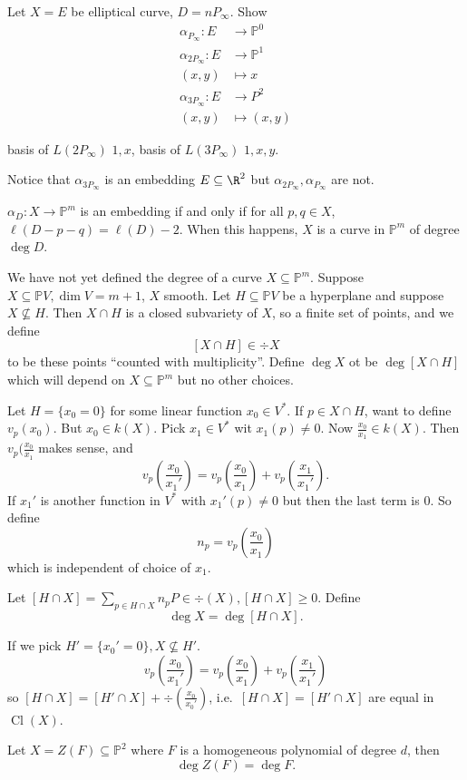 \documentclass[a4paper]{article}
\DeclareMathOperator{\Cl}{Cl}
\renewcommand*{\P}{\mathbb{P}}
\begin{document}
\begin{ex}
  Let \(X = E\) be elliptical curve, \(D = nP_\infty\). Show
  \begin{align*}
    \alpha_{P_\infty}: E &\to \P^0 \\
    \alpha_{2P_\infty}: E &\to \P^1 \\
    (x, y) &\mapsto x \\
    \alpha_{3P_\infty}: E &\to P^2 \\
    (x, y) &\mapsto (x, y)
  \end{align*}

  basis of \(L(2P_\infty)\) \(1, x\), basis of \(L(3P_\infty)\) \(1, x, y\).
  
  Notice that \(\alpha_{3P_\infty}\)  is an embedding \(E \subseteq \R^2\) but \(\alpha_{2P_\infty}, \alpha_{P_\infty}\) are not.
\end{ex}

\begin{theorem}
  \(\alpha_D: X \to \P^m\) is an embedding if and only if for all \(p, q \in X\), \(\ell(D - p - q) = \ell(D) - 2\). When this happens, \(X\) is a curve in \(\P^m\) of degree \(\deg D\).
\end{theorem}

We have not yet defined the degree of a curve \(X \subseteq \P^m\). Suppose \(X \subseteq \P V, \dim V = m + 1\), \(X\) smooth. Let \(H \subseteq \P V\) be a hyperplane and suppose \(X \nsubseteq H\). Then \(X \cap H\) is a closed subvariety of \(X\), so a finite set of points, and we define
\[
  [X \cap H] \in \div X
\]
to be these points ``counted with multiplicity''. Define \(\deg X\) ot be \(\deg [X \cap H]\) which will depend on \(X \subseteq \P^m\) but no other choices.

\begin{eg}
  Let \(H = \{x_0 = 0\}\) for some linear function \(x_0 \in V^*\). If \(p \in X \cap H\), want to define \(v_p(x_0)\). But \(x_0 \in k(X)\). Pick \(x_1 \in V^*\) wit \(x_1(p) \neq 0\). Now \(\frac{x_0}{x_1} \in k(X)\). Then \(v_p(\frac{x_0}{x_1}\) makes sense, and
  \[
    v_p(\frac{x_0}{x_1'}) = v_p(\frac{x_0}{x_1}) + v_p(\frac{x_1}{x_1'}).
  \]
  If \(x_1'\) is another function in \(V^*\) with \(x_1'(p) \neq 0\) but then the last term is \(0\). So define
  \[
    n_p = v_p(\frac{x_0}{x_1})
  \]
  which is independent of choice of \(x_1\).
\end{eg}

\begin{definition}
  Let \([H \cap X] = \sum_{p \in H \cap X} n_pP \in \div (X), [H \cap X] \geq 0\). Define
  \[
    \deg X = \deg [H \cap X].
  \]
\end{definition}

If we pick \(H' = \{x_0' = 0\}, X \nsubseteq H'\).
\[
  v_p(\frac{x_0}{x_1'}) = v_p(\frac{x_0}{x_1}) + v_p(\frac{x_1}{x_1'})
\]
so \([H \cap X] = [H' \cap X] + \div (\frac{x_0}{x_0'})\), i.e.\ \([H \cap X] = [H' \cap X]\) are equal in \(\Cl(X)\).

\begin{lemma}
  Let \(X = Z(F) \subseteq \P^2\) where \(F\) is a homogeneous polynomial of degree \(d\), then
  \[
    \deg Z(F) = \deg F.
  \]
\end{lemma}
\fi


\printindex
\end{document}

